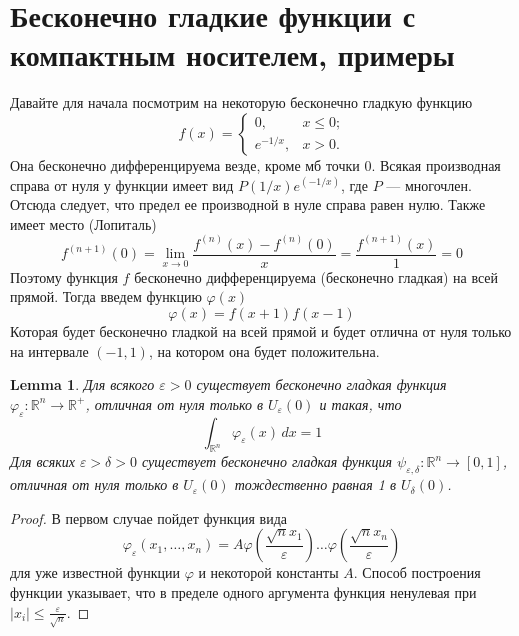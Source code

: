 \documentclass[a4paper,12pt]{article} %
\newtheorem{lemma}[theorem]{Lemma}
\theoremstyle{definition}
\begin{document}
\section{Бесконечно гладкие функции с компактным носителем, примеры}
Давайте для начала посмотрим на некоторую бесконечно гладкую функцию
\begin{equation}
	f(x) = 
	\begin{cases}
		0,  & \text{$x \leq 0$;} \\
		e^{-1/x},  & \text{$x > 0$.}
	\end{cases}
\end{equation}
Она бесконечно дифференцируема везде, кроме мб точки $0$. Всякая производная справа от нуля у функции имеет вид $P(1/x) e^(-1/x)$, где $P$ --- многочлен. Отсюда следует, что предел ее производной в нуле справа равен нулю. Также имеет место (Лопиталь)
\begin{equation}
	f^{(n+1)}(0) = \lim\limits_{x \rightarrow 0} \frac{f^{(n)}(x) - f^{(n)}(0)}{x} = \frac{f^{(n+1)}(x)}{1} = 0
\end{equation}
Поэтому функция $f$ бесконечно дифференцируема (бесконечно гладкая) на всей прямой. Тогда введем функцию $\varphi(x)$
\begin{equation}
	\varphi(x) = f(x + 1)f(x - 1)
\end{equation}
Которая будет бесконечно гладкой на всей прямой и будет отлична от нуля только на интервале $(-1, 1)$, на котором она будет положительна.
\begin{lemma}
	Для всякого $\varepsilon > 0$ существует бесконечно гладкая функция $\varphi_{\varepsilon} : \mathbb{R}^n \rightarrow \mathbb{R}^+$, отличная от нуля только в $U_{\varepsilon}(0)$ и такая, что 
	\begin{equation}
		\int_{\mathbb{R}^n} \varphi_{\varepsilon} (x) \, dx = 1
	\end{equation}
	Для всяких $\varepsilon > \delta > 0$ существует бесконечно гладкая функция $\psi_{\varepsilon, \delta} : \mathbb{R}^n \rightarrow [0, 1]$, отличная от  нуля только в $U_{\varepsilon}(0)$ тождественно равная 1 в $U_{\delta}(0)$.
 \end{lemma}
\begin{proof}
	В первом случае пойдет функция вида
	\begin{equation}
		\varphi_{\varepsilon}(x_1, \dots, x_n) = A \varphi(\frac{\sqrt{n} x_1}{\varepsilon}) \dots  \varphi(\frac{\sqrt{n} x_n}{\varepsilon}) 
	\end{equation}
	для уже известной функции $\varphi$ и некоторой константы $A$. Способ построения функции указывает, что в пределе одного аргумента функция ненулевая при $|x_i| \leq \frac{\varepsilon}{\sqrt{n}}$.
\end{proof}
\end{document}
